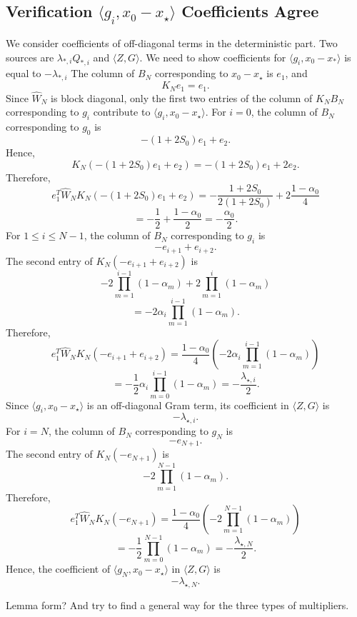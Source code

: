 {\subsection{Verification $\langle g_i, x_0-x_\star\rangle$ Coefficients Agree}
We consider coefficients of off-diagonal terms in the deterministic part. Two sources are
$\lambda_{*,i}Q_{*,i}$ and $\langle Z,G \rangle$. We need to show coefficients for $\langle g_i, x_0-x_* \rangle$ is equal to $-\lambda_{*,i}$
The column of $B_N$ corresponding to $x_0-x_\star$ is $e_1$, and \[K_Ne_1=e_1.\]
Since $\widehat{W}_N$ is block diagonal, only the first two entries of the column of $K_NB_N$ corresponding to $g_i$ contribute to $\langle g_i,x_0-x_\star\rangle$.
For $i=0$, the column of $B_N$ corresponding to $g_0$ is \[-(1+2S_0)e_1+e_2.\]
Hence,\[K_N(-(1+2S_0)e_1+e_2)=-(1+2S_0)e_1+2e_2.\]
Therefore,\[e_1^T\widehat{W}_N K_N(-(1+2S_0)e_1+e_2)=-\frac{1+2S_0}{2(1+2S_0)}+2\frac{1-\alpha_0}{4}\]
\[=-\frac{1}{2}+\frac{1-\alpha_0}{2}=-\frac{\alpha_0}{2}.\]
For $1\le i\le N-1$, the column of $B_N$ corresponding to $g_i$ is
\[-e_{i+1}+e_{i+2}.\]
The second entry of $K_N(-e_{i+1}+e_{i+2})$ is
\[-2\prod_{m=1}^{i-1}(1-\alpha_m)+2\prod_{m=1}^{i}(1-\alpha_m)\]
\[=-2\alpha_i\prod_{m=1}^{i-1}(1-\alpha_m).\]
Therefore,
\[e_1^T\widehat{W}_N K_N(-e_{i+1}+e_{i+2})=\frac{1-\alpha_0}{4}\left(-2\alpha_i\prod_{m=1}^{i-1}(1-\alpha_m)\right)\]
\[=-\frac{1}{2} \alpha_i\prod_{m=0}^{i-1}(1-\alpha_m) = -\frac{\lambda_{\star,i}}{2}.\]
Since $\langle g_i,x_0-x_\star\rangle$ is an off-diagonal Gram term, its coefficient
in $\langle Z,G\rangle$ is
\[-\lambda_{\star,i}.\]
For $i=N$, the column of $B_N$ corresponding to $g_N$ is
\[-e_{N+1}.\]
The second entry of $K_N(-e_{N+1})$ is
\[-2\prod_{m=1}^{N-1}(1-\alpha_m).\]
Therefore,
\[e_1^T\widehat{W}_N K_N(-e_{N+1})=\frac{1-\alpha_0}{4}\left(-2\prod_{m=1}^{N-1}(1-\alpha_m)
\right)\]
\[=-\frac{1}{2} \prod_{m=0}^{N-1}(1-\alpha_m) = -\frac{\lambda_{\star,N}}{2}.\]
Hence, the coefficient of $\langle g_N,x_0-x_\star\rangle$ in
$\langle Z,G\rangle$ is \[-\lambda_{\star,N}. \]
\begin{remark}
    Lemma form? And try to find a general way for the three types of multipliers.
\end{remark}


}
